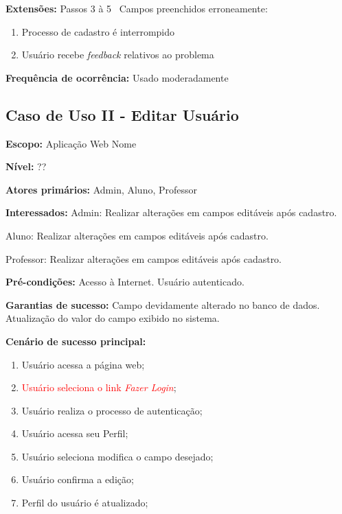 \documentclass[12pt,oneside,a4paper,article]{abntex2}
\begin{document}
		\textbf{Extensões:} Passos 3 à 5 \textrightarrow \ Campos preenchidos erroneamente:
		
			\begin{enumerate}[label=\alph*.]	
				\item Processo de cadastro é interrompido
				\item Usuário recebe \textit{feedback} relativos ao problema	
			\end{enumerate}
		
		\textbf{Frequência de ocorrência:} Usado moderadamente
			
		\subsection{Caso de Uso II - Editar Usuário}
		
		\textbf{Escopo:} Aplicação Web Nome
		
		\textbf{Nível:} ??
		
		\textbf{Atores primários:} Admin, Aluno, Professor
		
		\textbf{Interessados:} Admin: Realizar alterações em campos editáveis após cadastro.
		
		Aluno: Realizar alterações em campos editáveis após cadastro.
		
		Professor: Realizar alterações em campos editáveis após cadastro.
		
		\textbf{Pré-condições:} Acesso à Internet. Usuário autenticado.
		
		\textbf{Garantias de sucesso:} Campo devidamente alterado no banco de dados. Atualização do valor do campo exibido no sistema. 
		
		\textbf{Cenário de sucesso principal:}
		
		\begin{enumerate}
			\item Usuário acessa a página web;
			
			\item \textcolor{red}{Usuário seleciona o link \textit{Fazer Login}};
			
			\item Usuário realiza o processo de autenticação;
			
			\item Usuário acessa seu Perfil;
			
			\item Usuário seleciona modifica o campo desejado;
			
			\item Usuário confirma a edição;
			
			\item Perfil do usuário é atualizado;
			
		\end{enumerate}
		
\end{document}
